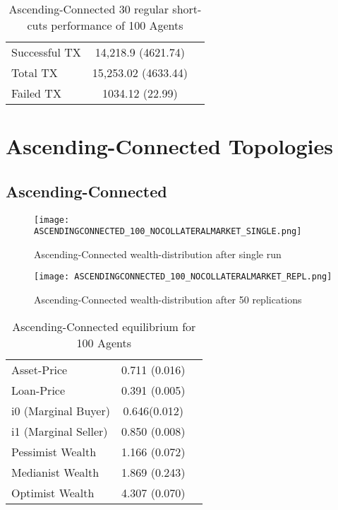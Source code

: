 \documentclass[Bachelorarbeit.tex]{subfiles}
\begin{document}
\begin{table}[!htbp]
	\caption{Ascending-Connected 30 regular short-cuts performance of 100 Agents}
	\centering
	\begin{tabular} { l c r }
		\hline
		Successful TX & 14,218.9 (4621.74) \\
		Total TX & 15,253.02 (4633.44) \\
		Failed TX & 1034.12 (22.99) \\
		\hline
	\end{tabular}
\end{table}

\section{Ascending-Connected Topologies} 

\subsection{Ascending-Connected}
\begin{figure}[!htbp]
	\centering
  \texttt{[image: ASCENDINGCONNECTED\_100\_NOCOLLATERALMARKET\_SINGLE.png]}
	\caption{Ascending-Connected wealth-distribution after single run}
	\label{fig1}
\end{figure}

\begin{figure}[!htbp]
	\centering
  \texttt{[image: ASCENDINGCONNECTED\_100\_NOCOLLATERALMARKET\_REPL.png]}
	\caption{Ascending-Connected wealth-distribution after 50 replications}
	\label{fig1}
\end{figure}

\begin{table}[h]
	\caption{Ascending-Connected equilibrium for 100 Agents}
	\centering
	\begin{tabular} { l c r }
		\hline
		Asset-Price & 0.711 (0.016) \\
		Loan-Price & 0.391 (0.005) \\
		i0 (Marginal Buyer) & 0.646(0.012) \\
		i1 (Marginal Seller) & 0.850 (0.008) \\
		Pessimist Wealth & 1.166 (0.072) \\
		Medianist Wealth & 1.869 (0.243) \\
		Optimist Wealth & 4.307 (0.070) \\
		\hline
	\end{tabular}
\end{table} 
\end{document}
